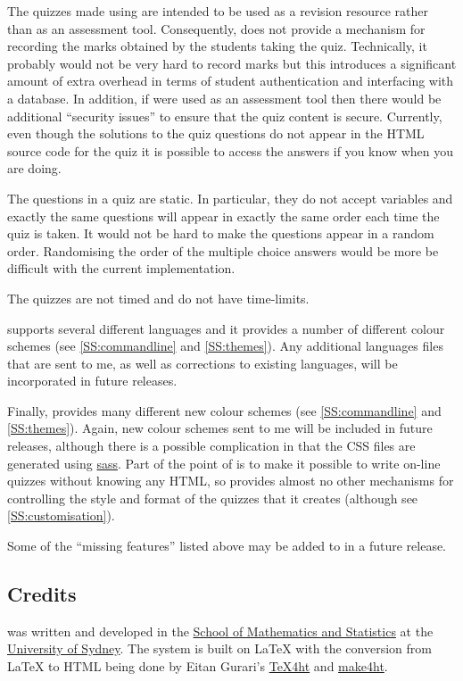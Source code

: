 \documentclass[svgnames]{article}
\begin{document}
    The quizzes made using \WebQuiz are intended to be used as a
    revision resource rather than as an assessment tool. Consequently,
    \WebQuiz does not provide a mechanism for recording the marks
    obtained by the students taking the quiz. Technically, it probably
    would not be very hard to record marks but this introduces a
    significant amount of extra overhead in terms of student
    authentication and interfacing with a database. In addition, if
    \WebQuiz were used as an assessment tool then there would be
    additional ``security issues'' to ensure that the quiz content is
    secure. Currently, even though the solutions to the quiz questions
    do not appear in the HTML source code for the quiz it is possible to
    access the answers if you know when you are doing.

    The questions in a \WebQuiz quiz are static. In particular, they do
    not accept variables and exactly the same questions will appear in
    exactly the same order each time the quiz is taken. It would not be
    hard to make the questions appear in a random order. Randomising the
    order of the multiple choice answers would be more be difficult with
    the current implementation.

    The quizzes are not timed and do not have time-limits.

    \WebQuiz supports several different languages and it
    provides a number of different colour schemes (see
    \autoref{SS:commandline} and \autoref{SS:themes}). Any additional
    languages files that are sent to me, as well as corrections to
    existing languages, will be incorporated in future releases.

    Finally, \WebQuiz provides many different new colour schemes (see
    \autoref{SS:commandline} and \autoref{SS:themes}). Again, new colour
    schemes sent to me will be included in future releases, although
    there is a possible complication in that the \WebQuiz CSS files are
    generated using \href{http://sass-lang.com/}{sass}. Part of the
    point of \WebQuiz is to make it possible to write on-line quizzes
    without knowing any HTML, so \WebQuiz provides almost no other
    mechanisms for controlling the style and format of the quizzes that
    it creates (although see \autoref{SS:customisation}).

    Some of the ``missing features'' listed above may be added to \WebQuiz in a future release.

\subsection{Credits}
    \WebQuiz{} was written and developed in the
    \href{http://www.maths.usyd.edu.au/}{School of Mathematics and
    Statistics} at the \href{http://www.usyd.edu.au/}{University of
    Sydney}.  The system is built on \LaTeX{} with the conversion from
    \LaTeX{} to HTML being done by Eitan Gurari's
    \href{http://www.cis.ohio-state.edu/~gurari/TeX4ht/mn.html}{TeX4ht}
    and
    \href{https://github.com/michal-h21/make4ht}{make4ht}.
\end{document}
